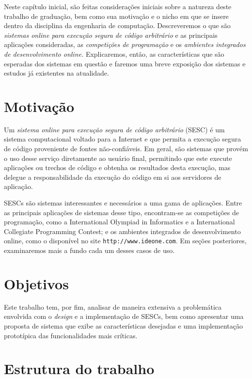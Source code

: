 \documentclass[ruledheader, 12pt]{abnt}
\begin{document}
Neste capítulo inicial, são feitas considerações iniciais sobre a natureza deste trabalho de graduação, bem como sua motivação e o nicho em que se insere dentro da disciplina da engenharia de computação. Descreveremos o que são \emph{sistemas online para execução segura de código arbitrário} e as principais aplicações consideradas, as \emph{competições de programação} e os \emph{ambientes integrados de desenvolvimento online.} Explicaremos, então, as características que são esperadas dos sistemas em questão e faremos uma breve exposição dos sistemas e estudos já existentes na atualidade.

\section{Motivação}


Um \emph{sistema online para execução segura de código arbitrário} (SESC) é um sistema computacional voltado para a Internet e que permita a execução segura de código proveniente de fontes não-confiáveis. Em geral, são sistemas que provém o uso desse serviço diretamente ao usuário final, permitindo que este execute aplicações ou trechos de código e obtenha os resultados desta execução, mas delegue a responsabilidade da execução do código em si aos servidores de aplicação.

SESCs são sistemas interessantes e necessários a uma gama de aplicações. Entre as principais aplicações de sistemas desse tipo, encontram-se as competições de programação, como a International Olympiad in Informatics e a International Collegiate Programming Contest; e os ambientes integrados de desenvolvimento online, como o disponível no site \verb|http://www.ideone.com|. Em seções posteriores, examinaremos mais a fundo cada um desses casos de uso.

\section{Objetivos}

Este trabalho tem, por fim, analisar de maneira extensiva a problemática envolvida com o \emph{design} e a implementação de SESCs, bem como apresentar uma proposta de sistema que exibe as características desejadas e uma implementação prototípica das funcionalidades mais críticas.

\section{Estrutura do trabalho}
\end{document}
